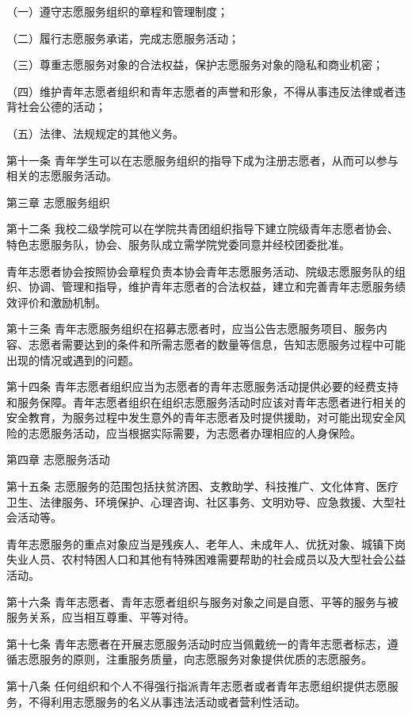 \documentclass[UTF8,12pt,a4paper]{report}
\begin{document}
（一）遵守志愿服务组织的章程和管理制度；

（二）履行志愿服务承诺，完成志愿服务活动；

（三）尊重志愿服务对象的合法权益，保护志愿服务对象的隐私和商业机密；

（四）维护青年志愿者组织和青年志愿者的声誉和形象，不得从事违反法律或者违背社会公德的活动；

（五）法律、法规规定的其他义务。

第十一条 青年学生可以在志愿服务组织的指导下成为注册志愿者，从而可以参与相关的志愿服务活动。

 

第三章  志愿服务组织

第十二条 我校二级学院可以在学院共青团组织指导下建立院级青年志愿者协会、特色志愿服务队，协会、服务队成立需学院党委同意并经校团委批准。

青年志愿者协会按照协会章程负责本协会青年志愿服务活动、院级志愿服务队的组织、协调、管理和指导，维护青年志愿者的合法权益，建立和完善青年志愿服务绩效评价和激励机制。

第十三条 青年志愿服务组织在招募志愿者时，应当公告志愿服务项目、服务内容、志愿者需要达到的条件和所需志愿者的数量等信息，告知志愿服务过程中可能出现的情况或遇到的问题。

第十四条 青年志愿者组织应当为志愿者的青年志愿服务活动提供必要的经费支持和服务保障。青年志愿者组织在组织志愿服务活动时应该对青年志愿者进行相关的安全教育，为服务过程中发生意外的青年志愿者及时提供援助，对可能出现安全风险的志愿服务活动，应当根据实际需要，为志愿者办理相应的人身保险。

 

第四章  志愿服务活动

第十五条 志愿服务的范围包括扶贫济困、支教助学、科技推广、文化体育、医疗卫生、法律服务、环境保护、心理咨询、社区事务、文明劝导、应急救援、大型社会活动等。

青年志愿服务的重点对象应当是残疾人、老年人、未成年人、优抚对象、城镇下岗失业人员、农村特困人口和其他有特殊困难需要帮助的社会成员以及大型社会公益活动。

第十六条 青年志愿者、青年志愿者组织与服务对象之间是自愿、平等的服务与被服务关系，应当相互尊重、平等对待。

第十七条 青年志愿者在开展志愿服务活动时应当佩戴统一的青年志愿者标志，遵循志愿服务的原则，注重服务质量，向志愿服务对象提供优质的志愿服务。

第十八条 任何组织和个人不得强行指派青年志愿者或者青年志愿组织提供志愿服务，不得利用志愿服务的名义从事违法活动或者营利性活动。
\end{document}
